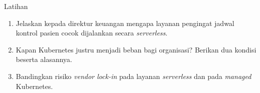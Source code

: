 \documentclass[aspectratio=169, table, 12pt]{beamer}
\begin{document}
\begin{frame}{{\Large Latihan}}
  \vspace{6pt}
  \begin{enumerate}
    \item Jelaskan kepada direktur keuangan mengapa layanan pengingat jadwal
          kontrol pasien cocok dijalankan secara \textit{serverless}.
    \item Kapan Kubernetes justru menjadi beban bagi organisasi? Berikan dua
          kondisi beserta alasannya.
    \item Bandingkan risiko \textit{vendor lock-in} pada layanan
          \textit{serverless} dan pada \textit{managed} Kubernetes.
  \end{enumerate}
\end{frame}
\end{document}
